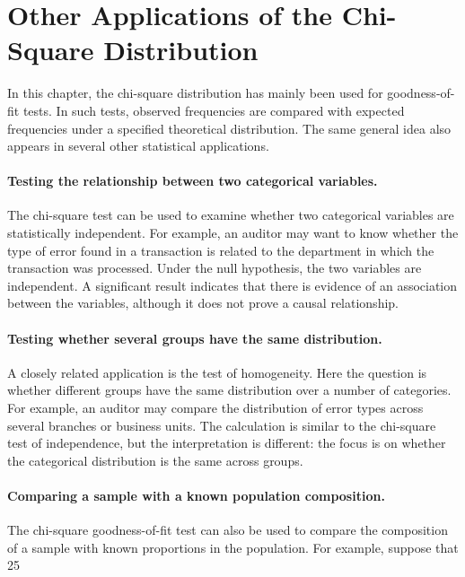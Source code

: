 \section{Other Applications of the Chi-Square Distribution}

In this chapter, the chi-square distribution has mainly been used for goodness-of-fit tests. In such tests, observed frequencies are compared with expected frequencies under a specified theoretical distribution. The same general idea also appears in several other statistical applications.

\paragraph{Testing the relationship between two categorical variables.} The chi-square test can be used to examine whether two categorical variables are statistically independent. For example, an auditor may want to know whether the type of error found in a transaction is related to the department in which the transaction was processed. Under the null hypothesis, the two variables are independent. A significant result indicates that there is evidence of an association between the variables, although it does not prove a causal relationship.

\paragraph{Testing whether several groups have the same distribution.} A closely related application is the test of homogeneity. Here the question is whether different groups have the same distribution over a number of categories. For example, an auditor may compare the distribution of error types across several branches or business units. The calculation is similar to the chi-square test of independence, but the interpretation is different: the focus is on whether the categorical distribution is the same across groups.

\paragraph{Comparing a sample with a known population composition.}
The chi-square goodness-of-fit test can also be used to compare the composition of a sample with known proportions in the population. For example, suppose that 25%

